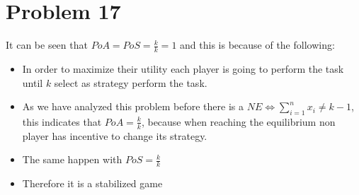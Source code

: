 \documentclass[12pt, a4paper]{article}
\begin{document}
\section{Problem 17}
It can be seen that $PoA = PoS = \frac{k}{k} = 1$ and this is because of the following:

\begin{itemize}
  \item In order to maximize their utility each player is going to perform the task until $k$ select as strategy perform the task. 
  \item As we have analyzed this problem before there is a $NE \iff \sum_{i=1}^n x_i \neq k-1$, this indicates that $PoA = \frac{k}{k}$, because when reaching the equilibrium non player has incentive to change its strategy.
  \item The same happen with $PoS = \frac{k}{k}$
  \item Therefore it is a stabilized game
\end{itemize}
\end{document}
